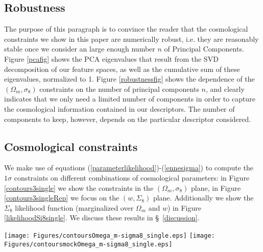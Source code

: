 \documentclass[reprint,aps,prd,superscriptaddress,showkeys,showpacs]{revtex4-1}
\begin{document}

\subsection{Robustness}
%
The purpose of this paragraph is to convince the reader that the cosmological constraints we show in this paper are numerically robust, i.e. they are reasonably stable once we consider an large enough number $n$ of Principal Components. Figure \ref{pcafig} shows the PCA eigenvalues that result from the SVD decomposition of our feature spaces, as well as the cumulative sum of these eigenvalues, normalized to 1. Figure \ref{robustnessfig} shows the dependence of the $(\Omega_m,\sigma_8)$ constraints on the number of principal components $n$, and clearly indicates that we only need a limited number of components in order to capture the cosmological information contained in our descriptors. The number of components to keep, however, depends on the particular descriptor considered. 


\subsection{Cosmological constraints}
%
We make use of equations (\ref{parameterlikelihood})-(\ref{ennesigma}) to compute the $1\sigma$ constraints on different combinations of cosmological parameters: in Figure \ref{contours3single} we show the constraints in the $(\Omega_m,\sigma_8)$ plane, in Figure \ref{contours3singleRep} we focus on the $(w,\Sigma_8)$ plane. Additionally we show the $\Sigma_8$ likelihood function (marginalized over $\Omega_m$ and $w$) in Figure \ref{likelihoodSi8single}. We discuss these results in \S~\ref{discussion}. 

\begin{figure*}
\begin{center}
\texttt{[image: Figures/contoursOmega\_m-sigma8\_single.eps]}
\texttt{[image: Figures/contoursmockOmega\_m-sigma8\_single.eps]}
\end{center}
\caption{$1\sigma$ constraints on the $(\Omega_m,\sigma_8)$ parameter doublet using the Power Spectrum (red), $V_0$ (blue), $V_1$ (green), $V_2$ (black) and Moments (orange) statistics; we show the constraints from the data (left panel) and from a mock observation constructed using the CFHTcov simulations as data (right panel). The contours are calculated from the parameter likelihood function $\mathcal{L}$ marginalized over $w$. The parentheses near the descriptor label refer to the number of principal components.}
\label{contours3single}
\end{figure*}
\end{document}
